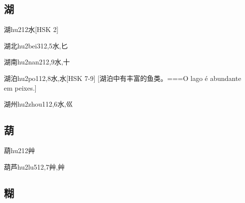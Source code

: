 \subsection*{湖}

\begin{EntryWithPhonetic}{湖}{hu2}{12}{⽔}[HSK 2]
\end{EntryWithPhonetic}

\begin{EntryWithPhonetic}{湖北}{hu2bei3}{12,5}{⽔,⼔}
\end{EntryWithPhonetic}

\begin{EntryWithPhonetic}{湖南}{hu2nan2}{12,9}{⽔,⼗}
\end{EntryWithPhonetic}

\begin{EntryWithPhonetic}{湖泊}{hu2po1}{12,8}{⽔,⽔}[HSK 7-9]
  [湖泊中有丰富的鱼类。===O lago é abundante em peixes.]
\end{EntryWithPhonetic}

\begin{EntryWithPhonetic}{湖州}{hu2zhou1}{12,6}{⽔,⼮}
\end{EntryWithPhonetic}

\subsection*{葫}

\begin{EntryWithPhonetic}{葫}{hu2}{12}{⾋}
\end{EntryWithPhonetic}

\begin{EntryWithPhonetic}{葫芦}{hu2lu5}{12,7}{⾋,⾋}
\end{EntryWithPhonetic}

\subsection*{糊}

